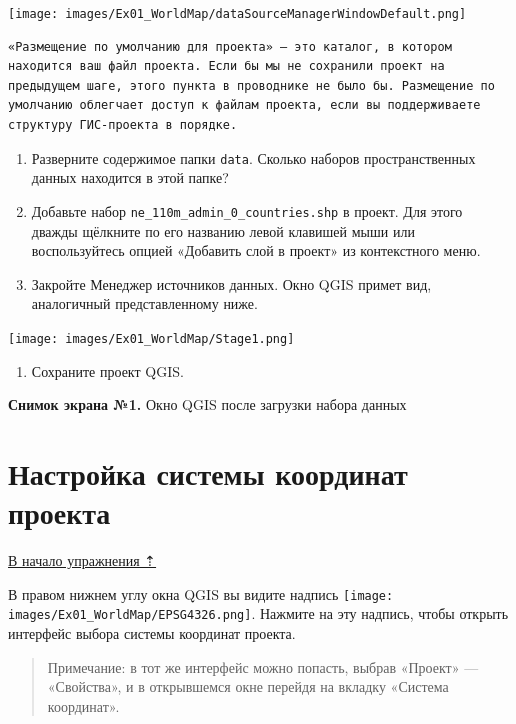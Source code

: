 \documentclass[
  12pt,
]{book}
\providecommand{\tightlist}{%
  \setlength{\itemsep}{0pt}\setlength{\parskip}{0pt}}
\begin{document}
\texttt{[image: images/Ex01\_WorldMap/dataSourceManagerWindowDefault.png]}

\begin{verbatim}
«Размещение по умолчанию для проекта» — это каталог, в котором находится ваш файл проекта. Если бы мы не сохранили проект на предыдущем шаге, этого пункта в проводнике не было бы. Размещение по умолчанию облегчает доступ к файлам проекта, если вы поддерживаете структуру ГИС-проекта в порядке.
\end{verbatim}

\begin{enumerate}
\def\labelenumi{\arabic{enumi}.}
\setcounter{enumi}{5}
\item
  Разверните содержимое папки \texttt{data}. Сколько наборов пространственных данных находится в этой папке?
\item
  Добавьте набор \texttt{ne\_110m\_admin\_0\_countries.shp} в проект. Для этого дважды щёлкните по его названию левой клавишей мыши или воспользуйтесь опцией «Добавить слой в проект» из контекстного меню.
\item
  Закройте Менеджер источников данных. Окно QGIS примет вид, аналогичный представленному ниже.
\end{enumerate}

\texttt{[image: images/Ex01\_WorldMap/Stage1.png]}

\begin{enumerate}
\def\labelenumi{\arabic{enumi}.}
\setcounter{enumi}{8}
\tightlist
\item
  Сохраните проект QGIS.
\end{enumerate}

\textbf{Снимок экрана №1.} Окно QGIS после загрузки набора данных

\hypertarget{map-design-world-crs}{%
\section{Настройка системы координат проекта}\label{map-design-world-crs}}

\protect\hyperlink{map-design-world}{В начало упражнения ⇡}

В правом нижнем углу окна QGIS вы видите надпись \texttt{[image: images/Ex01\_WorldMap/EPSG4326.png]}. Нажмите на эту надпись, чтобы открыть интерфейс выбора системы координат проекта.

\begin{quote}
Примечание: в тот же интерфейс можно попасть, выбрав «Проект» --- «Свойства», и в открывшемся окне перейдя на вкладку «Система координат».
\end{quote}
\end{document}
